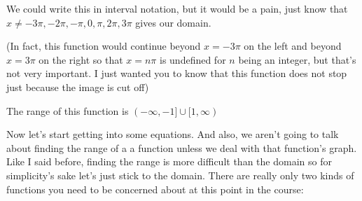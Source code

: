 \documentclass[12pt]{article}
\begin{document}
We could write this in interval notation, but it would be a pain, just know that $x \neq -3 \pi, -2 \pi, - \pi, 0, \pi, 2 \pi, 3 \pi$ gives our domain.

(In fact, this function would continue beyond $x = -3 \pi$ on the left and beyond $x = 3 \pi$ on the right so that $x = n \pi$ is undefined for $n$ being an integer, but that's not very important. I just wanted you to know that this function does not stop just because the image is cut off)

The range of this function is $(- \infty, -1] \cup [1, \infty)$
\newpage

Now let's start getting into some equations. And also, we aren't going to talk about finding the range of a a function unless we deal with that function's graph. Like I said before, finding the range is more difficult than the domain so for simplicity's sake let's just stick to the domain. There are really only two kinds of functions you need to be concerned about at this point in the course:
\end{document}
